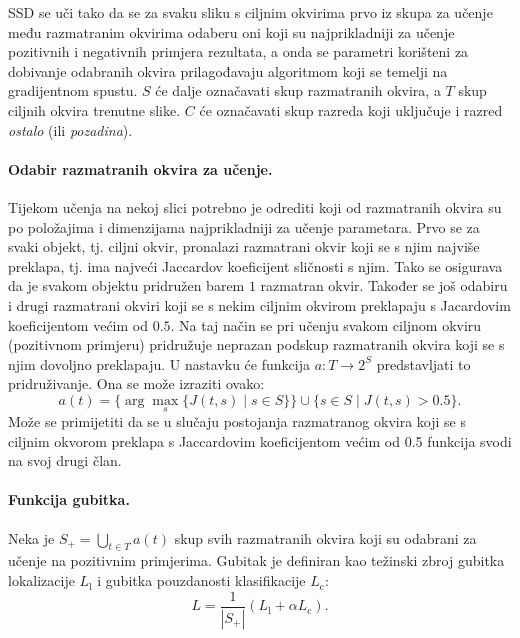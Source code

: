 \documentclass[utf8, seminar, numeric, lmodern]{feri}
\begin{document}
SSD se uči tako da se za svaku sliku s ciljnim okvirima prvo iz skupa za učenje među razmatranim okvirima odaberu oni koji su najprikladniji za učenje pozitivnih i negativnih primjera rezultata, a onda se parametri korišteni za dobivanje odabranih okvira prilagođavaju algoritmom koji se temelji na gradijentnom spustu. $S$ će dalje označavati skup razmatranih okvira, a $T$ skup ciljnih okvira trenutne slike. $C$ će označavati skup razreda koji uključuje i razred \emph{ostalo} (ili \emph{pozadina}).

\paragraph{Odabir razmatranih okvira za učenje.} Tijekom učenja na nekoj slici potrebno je odrediti koji od razmatranih okvira su po položajima i dimenzijama najprikladniji za učenje parametara. Prvo se za svaki objekt, tj. ciljni okvir, pronalazi razmatrani okvir koji se s njim najviše preklapa, tj. ima najveći Jaccardov koeficijent sličnosti s njim. Tako se osigurava da je svakom objektu pridružen barem $1$ razmatran okvir. Također se još odabiru i drugi razmatrani okviri koji se s nekim ciljnim okvirom preklapaju s Jacardovim koeficijentom većim od $0.5$. Na taj način se pri učenju svakom ciljnom okviru (pozitivnom primjeru) pridružuje neprazan podskup razmatranih okvira koji se s njim dovoljno preklapaju. U nastavku će funkcija $a\colon T\to 2^S$ predstavljati to pridruživanje. Ona se može izraziti ovako:
\begin{equation}
	a(t) = \{\arg\!\max_s \{ J(t,s) \mid s\in S\}\} \cup \{s\in S\mid J(t,s) > 0.5 \}.
\end{equation}
Može se primijetiti da se u slučaju postojanja razmatranog okvira koji se s ciljnim okvorom preklapa s Jaccardovim koeficijentom većim od 0.5 funkcija svodi na svoj drugi član.

\paragraph{Funkcija gubitka.}\label{par:ssd-ucenje-gubitak}
Neka je $S_+=\bigcup_{t\in T} a(t)$ skup svih razmatranih okvira koji su odabrani za učenje na pozitivnim primjerima. Gubitak je definiran kao težinski zbroj gubitka lokalizacije $L_\mathrm{l}$ i gubitka pouzdanosti klasifikacije $L_\mathrm{c}$:
\begin{equation}
L = \frac{1}{\left| S_+\right|}(L_\mathrm{l} + \alpha L_\mathrm{c}).
\end{equation}
\end{document}
